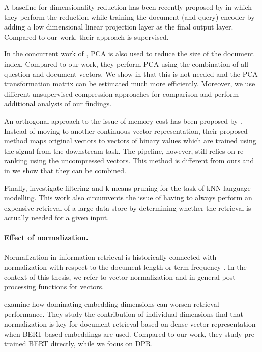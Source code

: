 A baseline for dimensionality reduction has been recently proposed by \citet{izacard2020memory} in which they perform the reduction while training the document (and query) encoder by adding a low dimensional linear projection layer as the final output layer. Compared to our work, their approach is supervised.

In the concurrent work of \citet{ma2021simple}, PCA is also used to reduce the size of the document index.
Compared to our work, they perform PCA using the combination of all question and document vectors. We show in  that this is not needed and the PCA transformation matrix can be estimated much more efficiently. Moreover, we use different unsupervised compression approaches for comparison and perform additional analysis of our findings.

An orthogonal approach to the issue of memory cost has been proposed by \citet{yamada2021efficient}.
Instead of moving to another continuous vector representation, their proposed method maps original vectors to vectors of binary values which are trained using the signal from the downstream task.
The pipeline, however, still relies on re-ranking using the uncompressed vectors.
This method is different from ours and in  we show that they can be combined.

Finally, \citet{he2021efficient} investigate filtering and k-means pruning for the task of kNN language modelling. This work also circumvents the issue of having to always perform an expensive retrieval of a large data store by determining whether the retrieval is actually needed for a given input.

\paragraph{Effect of normalization.}

Normalization in information retrieval is historically connected with normalization with respect to the document length or term frequency \citep{khalid2008impact,na2015two,roy2018using}.
In the context of this thesis, we refer to vector normalization and in general post-processing functions for vectors.

\citet{timkey2021all} examine how dominating embedding dimensions can worsen retrieval performance.
They study the contribution of individual dimensions find that normalization is key for document retrieval based on dense vector representation when BERT-based embeddings are used.
Compared to our work, they study pre-trained BERT directly, while we focus on DPR.

